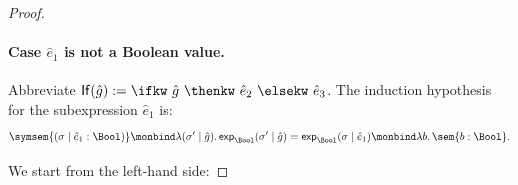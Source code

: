 \begin{proof}
  \paragraph{Case $\hat e_1$ is not a Boolean value.}
  Abbreviate $\mathsf{If}(\hat g) := \ifkw\ \hat g\ \thenkw\ \hat e_2\
  \elsekw\ \hat e_3$. The induction hypothesis for the subexpression $\hat e_1$ is:
  \begin{equation}
    \label{eq:expected-if-ih}
    \symsem{(\sigma \mid \hat e_1 : \Bool)}
    \monbind
    \lambda(\sigma' \mid \hat g).\,
    \mathsf{exp}_{\Bool}(\sigma' \mid \hat g)
    =
    \mathsf{exp}_{\Bool}(\sigma \mid \hat e_1)
    \monbind
    \lambda b.\,\sem{b : \Bool}.
  \end{equation}

  We start from the left-hand side:


\end{proof}
